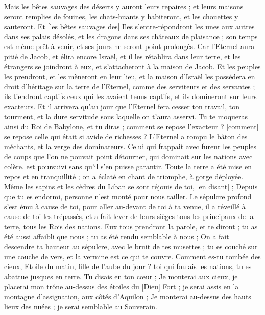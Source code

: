\begin{multicols}{2}
Mais les bêtes sauvages des déserts y auront leurs repaires ; et leurs maisons seront remplies de fouines, les chats-huants y habiteront, et les chouettes y sauteront.
Et [les bêtes sauvages des] Iles s'entre-répondront les unes aux autres dans ses palais désolés, et les dragons dans ses châteaux de plaisance ; son temps est même prêt à venir, et ses jours ne seront point prolongés.
\VerseOne{}Car l'Eternel aura pitié de Jacob, et élira encore Israël, et il les rétablira dans leur terre, et les étrangers se joindront à eux, et s'attacheront à la maison de Jacob.
Et les peuples les prendront, et les mèneront en leur lieu, et la maison d'Israël les possédera en droit d'héritage sur la terre de l'Eternel, comme des serviteurs et des servantes ; ils tiendront captifs ceux qui les avaient tenus captifs, et ils domineront sur leurs exacteurs.
Et il arrivera qu'au jour que l'Eternel fera cesser ton travail, ton tourment, et la dure servitude sous laquelle on t'aura asservi.
Tu te moqueras ainsi du Roi de Babylone, et tu diras ; comment se repose l'exacteur ? [comment] se repose celle qui était si avide de richesses ?
L'Eternel a rompu le bâton des méchants, et la verge des dominateurs.
Celui qui frappait avec fureur les peuples de coups que l'on ne pouvait point détourner, qui dominait sur les nations avec colère, est poursuivi sans qu'il s'en puisse garantir.
Toute la terre a été mise en repos et en tranquillité ; on a éclaté en chant de triomphe, à gorge déployée.
Même les sapins et les cèdres du Liban se sont réjouis de toi, [en disant] ; Depuis que tu es endormi, personne n'est monté pour nous tailler.
Le sépulcre profond s'est ému à cause de toi, pour aller au-devant de toi à ta venue, il a réveillé à cause de toi les trépassés, et a fait lever de leurs sièges tous les principaux de la terre, tous les Rois des nations.
Eux tous prendront la parole, et te diront ; tu as été aussi affaibli que nous ; tu as été rendu semblable à nous ;
On a fait descendre ta hauteur au sépulcre, avec le bruit de tes musettes ; tu es couché sur une couche de vers, et la vermine est ce qui te couvre.
Comment es-tu tombée des cieux, Etoile du matin, fille de l'aube du jour ? toi qui foulais les nations, tu es abattue jusques en terre.
Tu disais en ton cœur ; Je monterai aux cieux, je placerai mon trône au-dessus des étoiles du [Dieu] Fort ; je serai assis en la montagne d'assignation, aux côtés d'Aquilon ;
Je monterai au-dessus des hauts lieux des nuées ; je serai semblable au Souverain.

\end{multicols}
